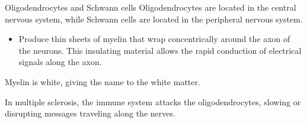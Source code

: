 \begin{minipage}{0.79\textwidth}
    \begin{descriptionlist}
        \item[Oligodendrocytes and Schwann cells] 
            Oligodendrocytes are located in the central nervous system, while 
            Schwann cells are located in the peripheral nervous system.
            \begin{itemize}
                \item Produce thin sheets of myelin that wrap concentrically around the axon of the neurons.
                    This insulating material allows the rapid conduction of electrical signals along the axon.
            \end{itemize}

            \begin{remark}
                Myelin is white, giving the name to the white matter.
            \end{remark}

            \begin{remark}
                In multiple sclerosis, the immune system attacks the oligodendrocytes, 
                slowing or disrupting messages traveling along the nerves.
            \end{remark}
    \end{descriptionlist}
\end{minipage}
